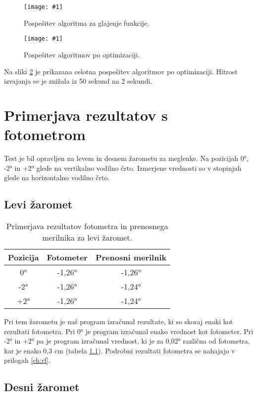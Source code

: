 \documentclass[oneside, a4paper, 12pt]{book}
\newcommand{\slika}[3]{
	\begin{figure}
	\begin{center}
	\texttt{[image: \#1]}
	\end{center}
	\vspace{-20pt}
	\caption{#2}
	\label{#3}
	\end{figure}
}
\begin{document}
\slika{slike/optimizacija_grafi/optimizacija-algoritma-za-glajenje-funkcij.jpg}{Pospešitev algoritma za glajenje funkcije.}{pic:opt-g}

\slika{slike/optimizacija_grafi/celotna-pospesitev.jpg}{Pospešitev algoritmov po optimizaciji.}{pic:opt-c}

Na sliki \ref{pic:opt-c} je prikazana celotna pospešitev algoritmov po optimizaciji. Hitrost izvajanja se je znižala iz 50 sekund na 2 sekundi.

\chapter{Primerjava rezultatov s fotometrom}
\label{ch:primerjava}
Test je bil opravljen na levem in desnem žarometu za meglenke. Na pozicijah 0°, -2° in +2° glede na vertikalno vodilno črto. Izmerjene vrednosti so v stopinjah glede na horizontalno vodilno črto.

\section{Levi žaromet}

\begin{table}
\begin{center}
\begin{tabular}{c|c|c}
\textbf{Pozicija} & \textbf{Fotometer} & \textbf{Prenosni merilnik} \\ \hline
0° & -1,26° & -1,26°  \\ \hline
-2°  & -1,26° & -1,24°   \\ \hline
+2°  & -1,26° & -1,24°   \\ 
\end{tabular}
\end{center}
\vspace{-20pt}
\caption{Primerjava rezultatov fotometra in prenosnega merilnika za levi žaromet.}

\label{tbl:primerjava-levi}
\end{table}

Pri tem žarometu je naš program izračunal rezultate, ki so skoraj enaki kot rezultati fotometra. Pri 0° je program izračunal enako vrednost kot fotometer. Pri -2° in +2° pa je program izračunal vrednost, ki je za 0,02° različna od fotometra, kar je enako 0,3 cm (tabela \ref{tbl:primerjava-levi}). Podrobni rezultati fotometra se nahajajo v prilogah \ref{ch:rf}.

\section{Desni žaromet}
\end{document}
